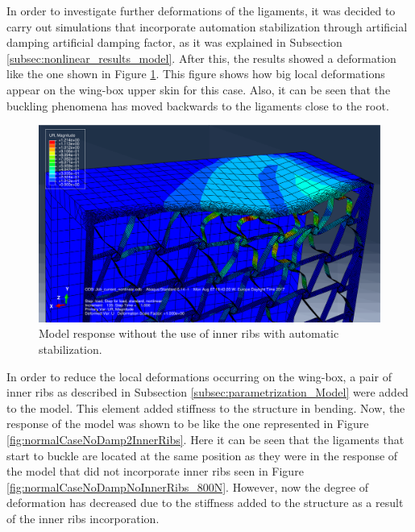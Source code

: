     In order to investigate further deformations of the ligaments, it was decided to carry out simulations that incorporate automation stabilization through artificial damping artificial damping factor, as it was explained in Subsection \ref{subsec:nonlinear_results_model}. After this, the results showed a deformation like the one shown in Figure \ref{fig:normalCaseDampNoInnerRibs}. This figure shows how big local deformations appear on the wing-box upper skin for this case. Also, it can be seen that the buckling phenomena has moved backwards to the ligaments close to the root.

    \begin{figure}[!htpb]
      \centering
      \includegraphics[width=0.8 \textwidth]{../figures/result-model/normalCaseDampNoInnerRibs}
      \caption[Model response without the use of inner ribs with automatic stabilization]{Model response without the use of inner ribs with automatic stabilization.}\label{fig:normalCaseDampNoInnerRibs}
    \end{figure}

    In order to reduce the local deformations occurring on the wing-box, a pair of inner ribs as described in Subsection \ref{subsec:parametrization_Model} were added to the model. This element added stiffness to the structure in bending. Now, the response of the model was shown to be like the one represented in Figure \ref{fig:normalCaseNoDamp2InnerRibs}. Here it can be seen that the ligaments that start to buckle are located at the same position as they were in the response of the model that did not incorporate inner ribs seen in Figure \ref{fig:normalCaseNoDampNoInnerRibs_800N}. However, now the degree of deformation has decreased due to the stiffness added to the structure as a result of the inner ribs incorporation.

